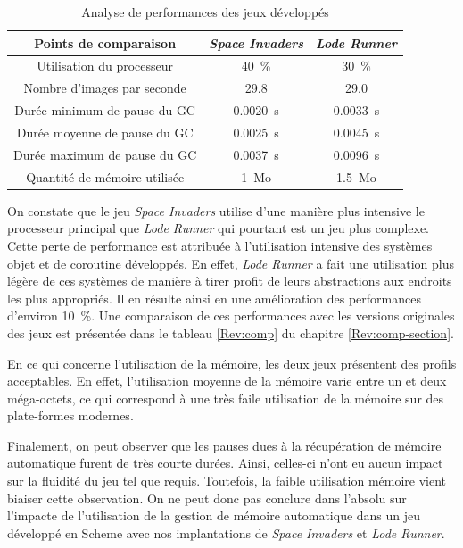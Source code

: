 \documentclass[12pt,twoside,letterpaper,francais]{book}
\newcommand{\customizedTableName}{\textsc{Tableau}}
\begin{document}
\renewcommand{\tablename}{\customizedTableName}
\begin{table}
  \center
  \begin{tabular}{ccc}
    \hline
    Points de comparaison & \textit{Space Invaders} & \textit{Lode Runner}\\
    \hline \hline
    Utilisation du processeur & 40~\% & 30~\%\\
    Nombre d'images par seconde & 29.8 & 29.0\\
    Durée minimum de pause du GC & 0.0020~s & 0.0033~s\\
    Durée moyenne de pause du GC & 0.0025~s & 0.0045~s\\
    Durée maximum de pause du GC & 0.0037~s & 0.0096~s\\
    Quantité de mémoire utilisée & 1~Mo& 1.5~Mo\\
    \hline
  \end{tabular}
  \caption{Analyse de performances des jeux développés}
  \label{Exp:perf}
\end{table}

On constate que le jeu \textit{Space Invaders} utilise d'une manière
plus intensive le processeur principal que \textit{Lode Runner} qui
pourtant est un jeu plus complexe. Cette perte de performance est
attribuée à l'utilisation intensive des systèmes objet et de coroutine
développés. En effet, \textit{Lode Runner} a fait une utilisation plus
légère de ces systèmes de manière à tirer profit de leurs abstractions
aux endroits les plus appropriés. Il en résulte ainsi en une
amélioration des performances d'environ 10~\%. Une comparaison de ces
performances avec les versions originales des jeux est présentée dans
le tableau \ref{Rev:comp} du chapitre \ref{Rev:comp-section}.

En ce qui concerne l'utilisation de la mémoire, les deux jeux
présentent des profils acceptables. En effet, l'utilisation moyenne de
la mémoire varie entre un et deux méga-octets, ce qui correspond à une
très faile utilisation de la mémoire sur des plate-formes modernes.

Finalement, on peut observer que les pauses dues à la récupération de
mémoire automatique furent de très courte durées. Ainsi, celles-ci
n'ont eu aucun impact sur la fluidité du jeu tel que
requis. Toutefois, la faible utilisation mémoire vient biaiser cette
observation. On ne peut donc pas conclure dans l'absolu sur l'impacte
de l'utilisation de la gestion de mémoire automatique dans un jeu
développé en Scheme avec nos implantations de \textit{Space Invaders}
et \textit{Lode Runner}.
\end{document}
